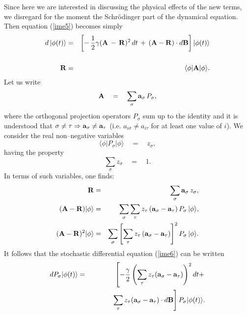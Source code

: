 \documentclass[12pt]{article}
\begin{document}
Since here we are interested in discussing the physical effects of
the new terms, we disregard for the moment the Schr\"odinger part
of the dynamical equation. Then equation (\ref{ime5}) becomes
simply
\begin{eqnarray} \label{ime6}
d\, |\phi(t)\rangle & = & \left[ -\,\frac{1}{2}\gamma ({\bf
A}\,-\, {\bf R})^{2}\, dt  \, + \, ( {\bf A} - {\bf R})\cdot d{\bf
B} \right]
|\phi(t)\rangle  \\
& & \nonumber \\
{\bf R} & = &  \langle \phi|{\bf A}|\phi \rangle. \nonumber
\end{eqnarray}
Let us write
\begin{equation} \label{sra}
{\bf A} \quad = \quad \sum_{\sigma} {\bf a}_{\sigma}\,P_{\sigma},
\end{equation}
where the orthogonal projection operators $P_{\sigma}$ sum up to
the identity and it is understood that $\sigma \neq \tau
\Rightarrow {\bf a}_{\sigma} \neq {\bf a}_{\tau}$ (i.e.
$a_{i\sigma} \neq a_{i\tau}$ for at least one value of $i$). We
consider the real non--negative variables
\begin{equation}
\langle \phi|P_{\sigma}|\phi \rangle \quad = \quad z_{\sigma},
\end{equation}
having the property
\begin{equation}
\sum_{\sigma} z_{\sigma} \quad = \quad 1.
\end{equation}
In terms of such variables, one finds:
\begin{eqnarray}
{\bf R} & = & \sum_{\sigma} {\bf a}_{\sigma}\, z_{\sigma}, \\
({\bf A} - {\bf R})|\phi\rangle & = & \sum_{\sigma} \sum_{\tau}
z_{\tau}\, ({\bf a}_{\sigma} - {\bf a}_{\tau})\, P_{\sigma}\,
|\phi\rangle,
\\
({\bf A} - {\bf R})^{2}|\phi\rangle & = & \sum_{\sigma} \left[
\sum_{\tau} z_{\tau}\, ({\bf a}_{\sigma} - {\bf
a}_{\tau})\right]^{2} P_{\sigma}\, |\phi\rangle.
\end{eqnarray}
It follows that the stochastic differential equation (\ref{ime6})
can be written
\begin{eqnarray} \label{ime7}
d P_{\sigma}|\phi(t)\rangle & = & \left[- \frac{\gamma}{2} \left(
\sum_{\tau} z_{\tau}({\bf a}_{\sigma} - {\bf a}_{\tau})\right)^{2}
dt + \right.
\nonumber \\
& & \qquad\quad \left. \sum_{\tau}z_{\tau}({\bf a}_{\sigma} - {\bf
a}_{\tau})\cdot d{\bf B} \right] P_{\sigma} |\phi(t)\rangle.
\end{eqnarray}
\end{document}
